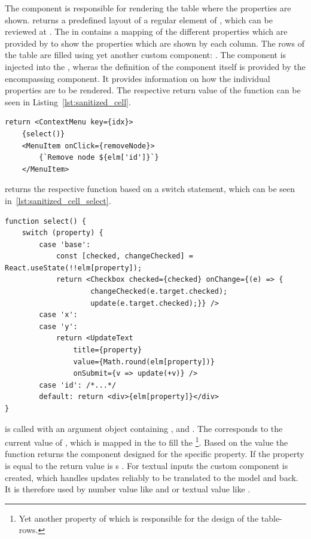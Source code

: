 The  component is responsible for rendering the table where the properties are shown.
 returns a predefined layout of a regular  element of , which can be reviewed at .
The  in  contains a mapping of the different properties which are provided by  to show the properties which are shown by each column.
The rows of the table are filled using yet another custom component: .
The  component is injected into the , wheras the definition of the component itself is provided by the encompassing component.
It provides information on how the individual properties are to be rendered.
The respective return value of the  function can be seen in Listing~\ref{lst:sanitized_cell}.

\begin{lstlisting}[label={lst:sanitized_cell}, caption={Return value of the \code{Node} components \code{SanitizedCell} function.}]
return <ContextMenu key={idx}>
    {select()}
    <MenuItem onClick={removeNode}>
        {`Remove node ${elm['id']}`}
    </MenuItem>
\end{lstlisting}

 returns the respective function based on a switch statement, which can be seen in~\ref{lst:sanitized_cell_select}.

\begin{lstlisting}[label={lst:sanitized_cell_select}, caption={\code{select} function in \code{SanitizedCell} of the \code{Node} component.}]
function select() {
    switch (property) {
        case 'base':
            const [checked, changeChecked] = React.useState(!!elm[property]);
            return <Checkbox checked={checked} onChange={(e) => {
                    changeChecked(e.target.checked);
                    update(e.target.checked);}} />
        case 'x':
        case 'y':
            return <UpdateText
                title={property}
                value={Math.round(elm[property])}
                onSubmit={v => update(+v)} />
        case 'id': /*...*/
        default: return <div>{elm[property]}</div>
}
\end{lstlisting}

 is called with an argument object containing ,  and .
The  corresponds to the current value of , which is mapped in the  to fill the \footnote{Yet another property of  which is responsible for the design of the table-rows.}.
Based on the  value the  function returns the component designed for the specific property.
If the property is equal to  the return value is s .
For textual inputs the custom component  is created, which handles updates reliably to be translated to the  model and back.
It is therefore used by number value like  and  or textual value like .

